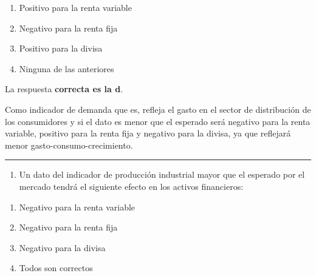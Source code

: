 \documentclass[
  letterpaper,
  DIV=11,
  numbers=noendperiod]{scrreprt}
\providecommand{\tightlist}{%
  \setlength{\itemsep}{0pt}\setlength{\parskip}{0pt}}\usepackage{longtable,booktabs,array}
\begin{document}
\begin{enumerate}
\def\labelenumi{\alph{enumi})}
\item
  Positivo para la renta variable
\item
  Negativo para la renta fija
\item
  Positivo para la divisa
\item
  Ninguna de las anteriores
\end{enumerate}

\begin{tcolorbox}[enhanced jigsaw, left=2mm, opacityback=0, colback=white, breakable, arc=.35mm, bottomrule=.15mm, rightrule=.15mm, toprule=.15mm, leftrule=.75mm, colframe=quarto-callout-tip-color-frame]
\begin{minipage}[t]{5.5mm}
\textcolor{quarto-callout-tip-color}{\faLightbulb}
\end{minipage}%
\begin{minipage}[t]{\textwidth - 5.5mm}

La respuesta \textbf{correcta es la d}.

Como indicador de demanda que es, refleja el gasto en el sector de
distribución de los consumidores y si el dato es menor que el esperado
será negativo para la renta variable, positivo para la renta fija y
negativo para la divisa, ya que reflejará menor
gasto-consumo-crecimiento.

\end{minipage}%
\end{tcolorbox}

\begin{center}\rule{0.5\linewidth}{0.5pt}\end{center}

\begin{enumerate}
\def\labelenumi{\arabic{enumi}.}
\setcounter{enumi}{39}
\tightlist
\item
  Un dato del indicador de producción industrial mayor que el esperado
  por el mercado tendrá el siguiente efecto en los activos financieros:
\end{enumerate}

\begin{enumerate}
\def\labelenumi{\alph{enumi})}
\item
  Negativo para la renta variable
\item
  Negativo para la renta fija
\item
  Negativo para la divisa
\item
  Todos son correctos
\end{enumerate}
\end{document}
